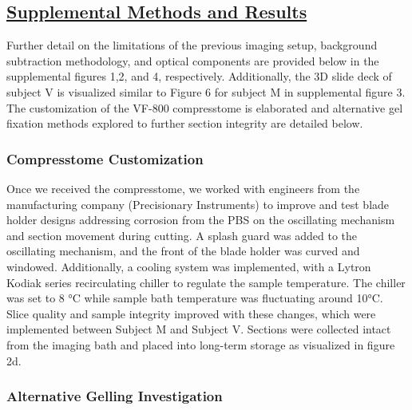 \documentclass{article}
\begin{document}

\subsection*{\underline{Supplemental Methods and Results}}

Further detail on the limitations of the previous imaging setup, background subtraction methodology, and optical components are provided below in the supplemental figures 1,2, and 4, respectively. Additionally, the 3D slide deck of subject V is visualized similar to Figure 6 for subject M in supplemental figure 3. The customization of the VF-800 compresstome is elaborated and alternative gel fixation methods explored to further section integrity are detailed below.

\subsubsection*{Compresstome Customization}

Once we received the compresstome, we worked with engineers from the manufacturing company (Precisionary Instruments) to improve and test blade holder designs addressing corrosion from the PBS on the oscillating mechanism and section movement during cutting. A splash guard was added to the oscillating mechanism, and the front of the blade holder was curved and windowed. Additionally, a cooling system was implemented, with a Lytron Kodiak series recirculating chiller to regulate the sample temperature. The chiller was set to 8 °C while sample bath temperature was fluctuating around 10°C. Slice quality and sample integrity improved with these changes, which were implemented between Subject M and Subject V. Sections were collected intact from the imaging bath and placed into long-term storage as visualized in figure 2d.

\subsubsection*{Alternative Gelling Investigation}
\end{document}
